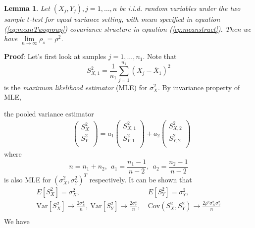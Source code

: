 \documentclass[review]{elsarticle}
\newtheorem{lemma}{Lemma}
\newcommand{\cov}{\text{Cov}}
\newcommand{\var}{\text{Var}}
\begin{document}
\begin{lemma}\label{thm:invScorlimit}
	Let $(X_j, Y_j), j = 1, \ldots, n$ be i.i.d. random variables under the two sample $t$-test 
	for equal variance setting, 
	with mean specified in equation (\ref{eq:meanTwogroup}) covariance structure in equation 
	(\ref{eq:meanstruct}). Then we have
	$\lim\limits_{n\rightarrow\infty}\rho_s = \rho^2$.
\end{lemma}
\textbf{Proof}: Let's first look at samples $j=1, \ldots, n_1$. Note that 
\begin{equation}\tag{B.5}
S_{X,1}^2= \frac{1}{n_1}\sum_{j=1}^{n_1}(X_j -\bar{X}_1)^2
\end{equation}
is the \textit{maximum likelihood estimator} (MLE) for $\sigma_X^2$. By invariance property of 
MLE,

the pooled variance estimator 
\begin{equation}\label{eq:Slinearcomb}\tag{B.6}
\begin{aligned}
&\left( \begin{array}{c}
S_{X}^2\\
S_{Y}^2\\
\end{array}\right)
= 
a_1\left( \begin{array}{c}
S_{X, 1}^2\\
S_{Y,1}^2\\
\end{array}\right)
+
a_2\left( \begin{array}{c}
S_{X, 2}^2\\
S_{Y, 2}^2\\
\end{array}\right)
\end{aligned}
\end{equation}
where 
\[ 	n = n_1 + n_2, ~~a_1 = \frac{n_1 -1}{n-2}, ~~a_2 = \frac{n_2 -1}{n-2} \]
is also MLE for $(\sigma_X^2, \sigma_Y^2)^T$ respectively.
It can be shown that 
\begin{equation}\label{eq:sampVarasypm}\tag{B.7}
\begin{aligned}
E[S_{X}^2] = \sigma_X^2,&~E[S_{Y}^2] = \sigma_Y^2,  \\
\var[S_{X}^2] \rightarrow \frac{2\sigma_X^4}{n},~\var[S_{Y}^2] \rightarrow 
\frac{2\sigma_Y^4}{n},&
~\cov(S_{X}^2, S_{Y}^2) \rightarrow \frac{2\rho^2\sigma_X^2\sigma_Y^2}{n} \\
\end{aligned}
\end{equation} 
We have 
\end{document}
